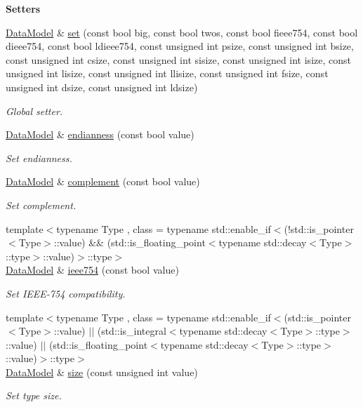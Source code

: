 \begin{Indent}{\bf Setters}\par
\begin{DoxyCompactItemize}
\item 
\hyperlink{exceptionmagrathea_1_1DataModel}{Data\-Model} \& \hyperlink{exceptionmagrathea_1_1DataModel_a5cead3b283ecf5605623d986348afe5b}{set} (const bool big, const bool twos, const bool fieee754, const bool dieee754, const bool ldieee754, const unsigned int psize, const unsigned int bsize, const unsigned int csize, const unsigned int sisize, const unsigned int isize, const unsigned int lisize, const unsigned int llisize, const unsigned int fsize, const unsigned int dsize, const unsigned int ldsize)
\begin{DoxyCompactList}\small\item\em Global setter. \end{DoxyCompactList}\item 
\hyperlink{exceptionmagrathea_1_1DataModel}{Data\-Model} \& \hyperlink{exceptionmagrathea_1_1DataModel_aad8c14017de1019eea73162146746817}{endianness} (const bool value)
\begin{DoxyCompactList}\small\item\em Set endianness. \end{DoxyCompactList}\item 
\hyperlink{exceptionmagrathea_1_1DataModel}{Data\-Model} \& \hyperlink{exceptionmagrathea_1_1DataModel_a12ceb490498520e8965ffc86769cd84e}{complement} (const bool value)
\begin{DoxyCompactList}\small\item\em Set complement. \end{DoxyCompactList}\item 
{\footnotesize template$<$typename Type , class  = typename std\-::enable\-\_\-if$<$(!std\-::is\-\_\-pointer$<$\-Type$>$\-::value) \&\& (std\-::is\-\_\-floating\-\_\-point$<$typename std\-::decay$<$\-Type$>$\-::type$>$\-::value)$>$\-::type$>$ }\\\hyperlink{exceptionmagrathea_1_1DataModel}{Data\-Model} \& \hyperlink{exceptionmagrathea_1_1DataModel_a7836281a871011107e5060ad12f080d3}{ieee754} (const bool value)
\begin{DoxyCompactList}\small\item\em Set I\-E\-E\-E-\/754 compatibility. \end{DoxyCompactList}\item 
{\footnotesize template$<$typename Type , class  = typename std\-::enable\-\_\-if$<$(std\-::is\-\_\-pointer$<$\-Type$>$\-::value) $|$$|$ (std\-::is\-\_\-integral$<$typename std\-::decay$<$\-Type$>$\-::type$>$\-::value) $|$$|$ (std\-::is\-\_\-floating\-\_\-point$<$typename std\-::decay$<$\-Type$>$\-::type$>$\-::value)$>$\-::type$>$ }\\\hyperlink{exceptionmagrathea_1_1DataModel}{Data\-Model} \& \hyperlink{exceptionmagrathea_1_1DataModel_ad5204f209e5a2de2a2c1664ce10b2bb6}{size} (const unsigned int value)
\begin{DoxyCompactList}\small\item\em Set type size.   \end{DoxyCompactList}\end{DoxyCompactItemize}
\end{Indent}
